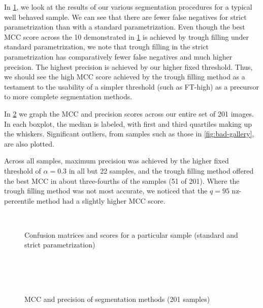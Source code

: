 In \cref{fig:seg-montage-example}, we look at the results of our various segmentation procedures for a typical well behaved sample. We can see that there are fewer false negatives for strict parametrization than with a standard parametrization. Even though the best MCC score across the 10 demonstrated in \cref{fig:seg-montage-example} is achieved by trough filling under standard parametrization, we note that trough filling in the strict parametrization has comparatively fewer false negatives and much higher precision. The highest precision is achieved by our higher fixed threshold. Thus, we should see the high MCC score achieved by the trough filling method as a testament to the usability of a simpler threshold (such as FT-high) as a precursor to more complete segmentation methods.


In \cref{fig:scoring-boxplots} we graph the MCC and precision scores across our entire set of 201 images. In each boxplot, the median is labeled, with first and third quartiles making up the whiskers. Significant outliers, from samples such as those in \cref{fig:bad-gallery}, are also plotted. 

Across all samples, maximum precision was achieved by the higher fixed threshold of $\alpha =0.3 $ in all but 22 samples, and the trough filling method offered the best MCC in about three-fourths of the samples (51 of 201). Where the trough filling method was not most accurate, we noticed that the $q=95 $ nz-percentile method had a slightly higher MCC score. 




\begin{figure}[p] \centering
   \\
  \caption{Confusion matrices and scores for a particular sample (standard and strict parametrization)}
	\label{fig:seg-montage-example}
\end{figure}

\begin{figure}[p] \centering
   \\
   \\
   \\
      \caption{MCC and precision of segmentation methods (201 samples)}
      \label{fig:scoring-boxplots}
\end{figure}
